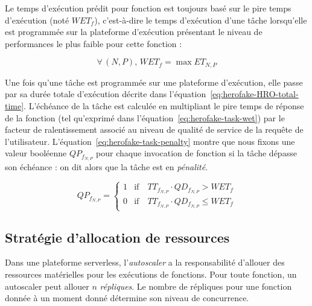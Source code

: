 Le temps d'exécution prédit pour fonction est toujours basé sur le pire temps d'exécution (noté $WET_{f}$), c'est-à-dire le temps d'exécution d'une tâche lorsqu'elle est programmée sur la plateforme d'exécution présentant le niveau de performances le plus faible pour cette fonction :

\begin{equation}
    \forall \, (N, P), \, WET_{f} = \max ET_{N, P}
\label{eq:herofake-task-wet}
\end{equation}

Une fois qu'une tâche est programmée sur une plateforme d'exécution, elle passe par sa durée totale d'exécution décrite dans l'équation~\ref{eq:herofake-HRO-total-time}. L'échéance de la tâche est calculée en multipliant le pire temps de réponse de la fonction (tel qu'exprimé dans l'équation~\ref{eq:herofake-task-wet}) par le facteur de ralentissement associé au niveau de qualité de service de la requête de l'utilisateur. L'équation~\ref{eq:herofake-task-penalty} montre que nous fixons une valeur booléenne $QP_{f_{N, P}}$ pour chaque invocation de fonction si la tâche dépasse son échéance : on dit alors que la tâche est en \textit{pénalité}.


\begin{equation}
    QP_{f_{N, P}} =
    \begin{cases}
    1 & \text{if} \quad TT_{f_{N, P}} \cdot QD_{f_{N, P}} > WET_{f} \\
    0 & \text{if} \quad TT_{f_{N, P}} \cdot QD_{f_{N, P}} \leq WET_{f}
    \end{cases}
\label{eq:herofake-task-penalty}
\end{equation}

\subsection{Stratégie d'allocation de ressources} \label{section:herofake-autoscaling-strategy}

Dans une plateforme serverless, l'\textit{autoscaler} a la responsabilité d'allouer des ressources matérielles pour les exécutions de fonctions. Pour toute fonction, un autoscaler peut allouer $n$ \textit{répliques}. Le nombre de répliques pour une fonction donnée à un moment donné détermine son niveau de concurrence.

